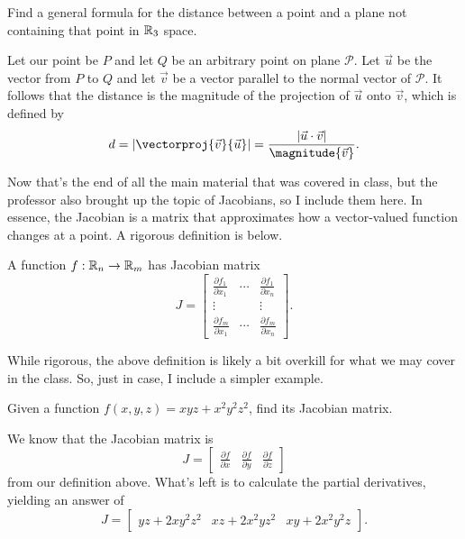 \documentclass[11pt]{scrartcl}
\begin{document}
\begin{example}
    Find a general formula for the distance between a point and a plane not containing that point in $\mathbb R_{3}$ space.

    \begin{soln}
        Let our point be $P$ and let $Q$ be an arbitrary point on plane $\mathcal{P}$. Let $\vec{u}$ be the vector from $P$ to $Q$ and let $\vec{v}$ be a vector parallel to the normal vector of $\mathcal{P}$. It follows that the distance is the magnitude of the projection of $\vec{u}$ onto $\vec{v}$, which is defined by
        \[d = \abs{\vectorproj{\vec{v}}{\vec{u}}} = \frac{\abs{\vec{u} \cdot \vec{v}}}{\magnitude{\vec{v}}}.\]
    \end{soln}
\end{example}

Now that's the end of all the main material that was covered in class, but the professor also brought up the topic of Jacobians, so I include them here. In essence, the Jacobian is a matrix that approximates how a vector-valued function changes at a point. A rigorous definition is below.

\begin{definition}
    A function $f : \mathbb R_{n} \to \mathbb R_{m}$ has Jacobian matrix
    \[J = \begin{bmatrix}
        \frac{\partial f_{1}}{\partial x_{1}} & \cdots & \frac{\partial f_{1}}{\partial x_{n}} \\
        \vdots & & \vdots \\
        \frac{\partial f_{m}}{\partial x_{1}} & \cdots & \frac{\partial f_{m}}{\partial x_{n}}
    \end{bmatrix}.\]
\end{definition}

While rigorous, the above definition is likely a bit overkill for what we may cover in the class. So, just in case, I include a simpler example.

\begin{example}
    Given a function $f(x, y, z) = xyz + x^{2}y^{2}z^{2}$, find its Jacobian matrix.

    \begin{soln}
        We know that the Jacobian matrix is
        \[J = \begin{bmatrix}
            \frac{\partial f}{\partial x} & \frac{\partial f}{\partial y} & \frac{\partial f}{\partial z}
        \end{bmatrix}\]
        from our definition above. What's left is to calculate the partial derivatives, yielding an answer of
        \[J = \begin{bmatrix}
            yz + 2xy^{2}z^{2} & xz + 2x^{2}yz^{2} & xy + 2x^{2}y^{2}z
        \end{bmatrix}.\]
    \end{soln}
\end{example}
\end{document}
